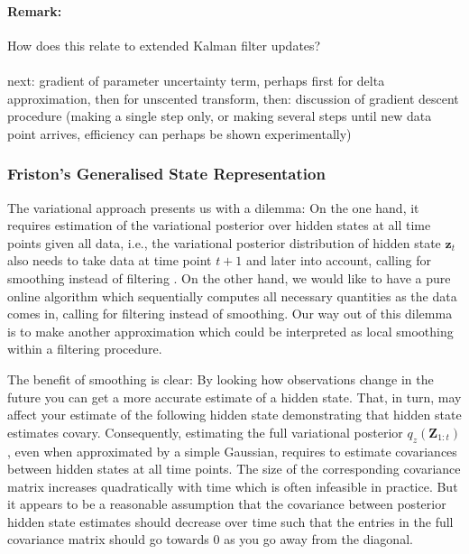 \documentclass[a4paper,10pt]{article}
\newcommand{\bs}[1]{\mathbf{#1}}					%
\renewcommand{\ss}{z}         %
\newcommand{\ps}{\bs{\ss}}    %
\newcommand{\Ps}{\bs{Z}}    %
\begin{document}
\paragraph{Remark:} How does this relate to extended Kalman filter updates?

\paragraph{} next: gradient of parameter uncertainty term, perhaps first for delta approximation, then for unscented transform, then: discussion of gradient descent procedure (making a single step only, or making several steps until new data point arrives, efficiency can perhaps be shown experimentally)


\subsubsection{Friston's Generalised State Representation}
\label{sec:genstaterep}
The variational approach presents us with a dilemma: On the one hand, it requires estimation of the variational posterior over hidden states at all time points given all data, i.e., the variational posterior distribution of hidden state $\ps_t$ also needs to take data at time point $t+1$ and later into account, calling for smoothing instead of filtering \citep[cf.][]{Beal2003}. On the other hand, we would like to have a pure online algorithm which sequentially computes all necessary quantities as the data comes in, calling for filtering instead of smoothing. Our way out of this dilemma is to make another approximation which could be interpreted as local smoothing within a filtering procedure.

The benefit of smoothing is clear: By looking how observations change in the future you can get a more accurate estimate of a hidden state. That, in turn, may affect your estimate of the following hidden state demonstrating that hidden state estimates covary. Consequently, estimating the full variational posterior $q_{\ss}(\Ps_{1:t})$, even when approximated by a simple Gaussian, requires to estimate covariances between hidden states at all time points. The size of the corresponding covariance matrix increases quadratically with time which is often infeasible in practice. But it appears to be a reasonable assumption that the covariance between posterior hidden state estimates should decrease over time such that the entries in the full covariance matrix should go towards 0 as you go away from the diagonal. 
\end{document}
